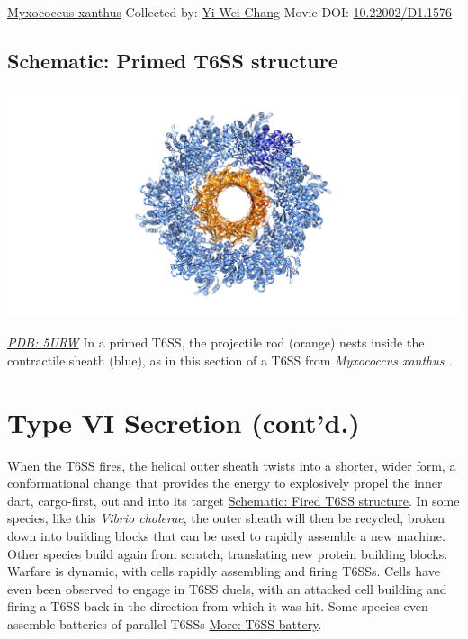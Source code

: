 \documentclass[]{tufte-book}
\begin{document}
\hypertarget{htmlwidget-d08ae92cf972608eecb0}{}

\label{fig:9-6}\protect\hyperlink{tree}{Myxococcus xanthus} Collected by: \protect\hyperlink{yi-wei_chang}{Yi-Wei Chang} Movie DOI: \href{https://doi.org/10.22002/D1.1576}{10.22002/D1.1576}

\hypertarget{Primed_T6SS_structure}{%
\subsection*{Schematic: Primed T6SS structure}\label{Primed_T6SS_structure}}

\includegraphics{img/schematics/9_6_1}

\href{http://rcsb.org/structure/5URW}{\emph{PDB: 5URW}}
In a primed T6SS, the projectile rod (orange) nests inside the contractile sheath (blue), as in this section of a T6SS from \emph{Myxococcus xanthus} \citep{chang2017}.

\hypertarget{type-vi-secretion-contd.}{%
\section{Type VI Secretion (cont'd.)}\label{type-vi-secretion-contd.}}

When the T6SS fires, the helical outer sheath twists into a shorter, wider form, a conformational change that provides the energy to explosively propel the inner dart, cargo-first, out and into its target \protect\hyperlink{Fired_T6SS_structure}{Schematic: Fired T6SS structure}. In some species, like this \emph{Vibrio cholerae}, the outer sheath will then be recycled, broken down into building blocks that can be used to rapidly assemble a new machine. Other species build again from scratch, translating new protein building blocks. Warfare is dynamic, with cells rapidly assembling and firing T6SSs. Cells have even been observed to engage in T6SS duels, with an attacked cell building and firing a T6SS back in the direction from which it was hit. Some species even assemble batteries of parallel T6SSs \protect\hyperlink{T6SS_battery}{More: T6SS battery}.
\end{document}
